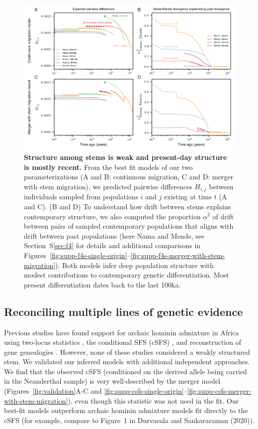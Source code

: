 \documentclass[]{article}
\begin{document}
\begin{figure}[t!]
    \centering
    \includegraphics{figures/predictions.pdf}
    \caption{
        \textbf{Structure among stems is weak and present-day structure is mostly recent.}
        From the best fit models of our two parameterizations (A and B:
        continuous migration, C and D: merger with stem migration),
        we predicted pairwise differences $H_{i,j}$ between individuals
        sampled from populations $i$ and $j$ existing at time $t$ (A and C).
        (B and D) To understand how drift between stems explains contemporary structure, 
        we also computed the proportion $\alpha^2$ of drift between pairs of
        sampled contemporary
        populations that aligns with drift between past populations
        (here Nama and Mende, see Section~S\ref{sec:f4} for details and additional
        comparisons in Figures~\ref{fig:supp-f4s-single-origin}--\ref{fig:supp-f4s-merger-with-stem-migration}).
        Both models infer deep population structure with modest contributions to
        contemporary genetic differentiation.
        Most present differentiation dates back to the last 100ka.
    }
    \label{fig:predictions}
\end{figure}

\subsection*{Reconciling multiple lines of genetic evidence}

Previous studies have found support for archaic hominin admixture in Africa using
two-locus statistics \citep{Hsieh2016-gk,Ragsdale2019-nt}, the conditional SFS
(cSFS) \citep{Durvasula2020-td}, and reconstruction of gene genealogies
\citep{Speidel2019-nj}. However, none of these studies considered a weakly
structured stem. We validated our inferred models with additional independent
approaches. We find that the observed cSFS (conditioned on the derived allele
being carried in the Neanderthal sample) is very well-described by the merger
model (Figures~\ref{fig:validation}A-C and
\ref{fig:supp-csfs-single-origin}--\ref{fig:supp-csfs-merger-with-stem-migration}),
even though this statistic was not used in the fit. Our best-fit models outperform
archaic hominin admixture models fit directly to the cSFS
(for example, compare to Figure~1 in
Durvasula and Sankararaman (2020)\citep{Durvasula2020-td}).
\end{document}
